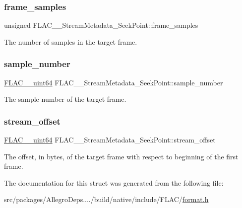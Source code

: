 \subsubsection{\texorpdfstring{frame\+\_\+samples}{frame\_samples}}
{\footnotesize\ttfamily unsigned F\+L\+A\+C\+\_\+\+\_\+\+Stream\+Metadata\+\_\+\+Seek\+Point\+::frame\+\_\+samples}

The number of samples in the target frame. \mbox{\label{struct_f_l_a_c_____stream_metadata___seek_point_a96a62923f1443fd3a5a3498e701e6ecf}} 
\subsubsection{\texorpdfstring{sample\+\_\+number}{sample\_number}}
{\footnotesize\ttfamily \hyperlink{ordinals_8h_aa78c8c70a3eb8a58af7436f278acde8e}{F\+L\+A\+C\+\_\+\+\_\+uint64} F\+L\+A\+C\+\_\+\+\_\+\+Stream\+Metadata\+\_\+\+Seek\+Point\+::sample\+\_\+number}

The sample number of the target frame. \mbox{\label{struct_f_l_a_c_____stream_metadata___seek_point_a6028398e99f937b002618af677d32c9f}} 
\subsubsection{\texorpdfstring{stream\+\_\+offset}{stream\_offset}}
{\footnotesize\ttfamily \hyperlink{ordinals_8h_aa78c8c70a3eb8a58af7436f278acde8e}{F\+L\+A\+C\+\_\+\+\_\+uint64} F\+L\+A\+C\+\_\+\+\_\+\+Stream\+Metadata\+\_\+\+Seek\+Point\+::stream\+\_\+offset}

The offset, in bytes, of the target frame with respect to beginning of the first frame. 

The documentation for this struct was generated from the following file\+:\begin{DoxyCompactItemize}
\item 
src/packages/\+Allegro\+Deps..../build/native/include/\+F\+L\+A\+C/\hyperlink{format_8h}{format.\+h}\end{DoxyCompactItemize}
